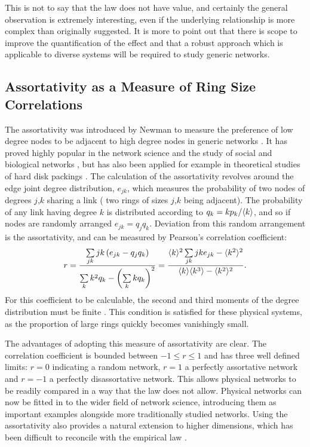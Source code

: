 This is not to say that the \aw{} law does not have value, and certainly the general observation is extremely interesting, even if the underlying relationship is more complex than originally suggested.
It is more to point out that there is scope to improve the quantification of the effect and that a robust approach which is applicable to diverse systems will be required to study generic \td{} networks.

\subsection{Assortativity as a Measure of Ring Size Correlations}

The assortativity was introduced by Newman to measure the preference of low degree nodes to be adjacent to high degree nodes in generic networks \cite{Newman2002}.
It has proved highly popular in the network science and the study of social and biological networks \cite{Noldus2015}, but has also been applied for example in theoretical studies of hard disk packings \cite{Chremos2007}.
The calculation of the assortativity revolves around the edge joint degree distribution, $e_{jk}$, which measures the probability of two nodes of degrees $j$,$k$ sharing a link (\ie{} two rings of sizes $j$,$k$ being adjacent).
The probability of any link having degree $k$ is distributed according to $q_k=kp_k/\langle k \rangle$, and so if nodes are randomly arranged $e_{jk}=q_j q_k$.
Deviation from this random arrangement is the assortativity, and can be measured by Pearson's correlation coefficient:
\begin{equation}
        \label{eq:assortativity}
        r = \frac{\sum\limits_{jk} jk\left(e_{jk}-q_jq_k\right)}{\sum\limits_k k^2q_k - \left(\sum\limits_k kq_k\right)^2}=\frac{\langle k \rangle^2\sum\limits_{jk} jke_{jk}-\langle k^2 \rangle^2}{\langle k \rangle\langle k^3 \rangle-\langle k^2 \rangle^2}.
\end{equation}
For this coefficient to be calculable, the second and third moments of the degree distribution must be finite \cite{Litvak2013}.
This condition is satisfied for these physical systems, as the proportion of large rings quickly becomes vanishingly small.

The advantages of adopting this measure of assortativity are clear.
The correlation coefficient is bounded between $-1\leq r \leq 1$ and has three well defined limits: $r=0$ indicating a random network, $r=1$ a perfectly assortative network and $r=-1$ a perfectly disassortative network.
This allows physical networks to be readily compared in a way that the \aw{} law does not allow.
Physical networks can now be fitted in to the wider field of network science, introducing them as important examples alongside more traditionally studied networks.
Using the assortativity also provides a natural extension to higher dimensions, which has been difficult to reconcile with the empirical \aw{} law \cite{Mason2012}.

